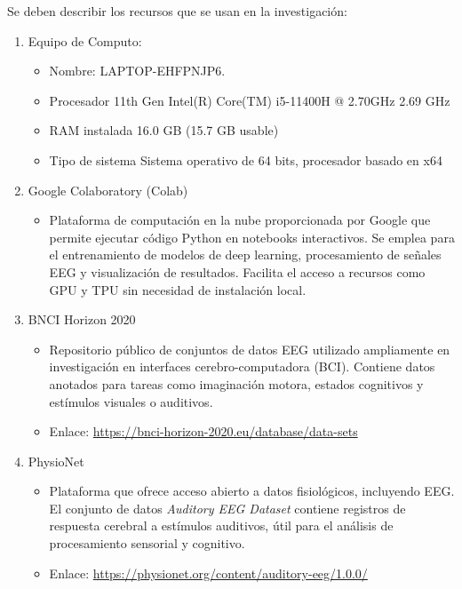 Se deben describir los recursos que se usan en la investigación:

\begin{enumerate}
	\item Equipo de Computo:
	\begin{itemize}
		\item Nombre: LAPTOP-EHFPNJP6.
		\item Procesador	11th Gen Intel(R) Core(TM) i5-11400H @ 2.70GHz   2.69 GHz
		\item RAM instalada	16.0 GB (15.7 GB usable)
		\item Tipo de sistema	Sistema operativo de 64 bits, procesador basado en x64
	\end{itemize}

    \item Google Colaboratory (Colab)
    \begin{itemize}
        \item Plataforma de computación en la nube proporcionada por Google que permite ejecutar código Python en notebooks interactivos. Se emplea para el entrenamiento de modelos de deep learning, procesamiento de señales EEG y visualización de resultados. Facilita el acceso a recursos como GPU y TPU sin necesidad de instalación local.
    \end{itemize}
    
    \item BNCI Horizon 2020
    \begin{itemize}
    \item Repositorio público de conjuntos de datos EEG utilizado ampliamente en investigación en interfaces cerebro-computadora (BCI). Contiene datos anotados para tareas como imaginación motora, estados cognitivos y estímulos visuales o auditivos. 
    \item Enlace: \url{https://bnci-horizon-2020.eu/database/data-sets}
    \end{itemize}

    \item PhysioNet
    \begin{itemize}
    \item Plataforma que ofrece acceso abierto a datos fisiológicos, incluyendo EEG. El conjunto de datos \textit{Auditory EEG Dataset} contiene registros de respuesta cerebral a estímulos auditivos, útil para el análisis de procesamiento sensorial y cognitivo.
    \item Enlace: \url{https://physionet.org/content/auditory-eeg/1.0.0/}
\end{itemize}

\end{enumerate}
